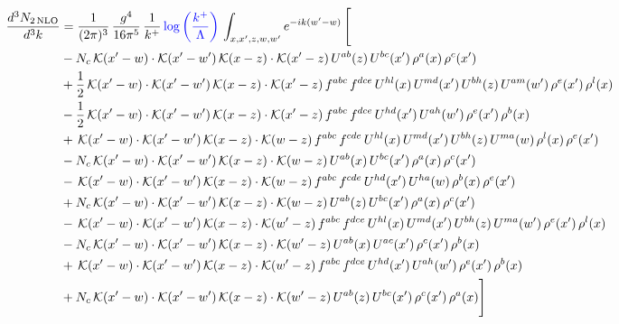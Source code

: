 \documentclass[9pt]{article}
\numberwithin{equation}{section}
\begin{document}
\begin{align}
\frac{d^{3}N_{2\,\mathrm{NLO}}}{d^{3}k} & = \frac{1}{(2\pi)^{3}}\,\frac{g^{4}}{16\pi^{5}}\,\frac{1}{k^{+}}\,{\color{blue}\log{\left(\frac{k^{+}}{\Lambda}\right)}}\,\int_{x,x',z,w,w'}e^{-ik(w'-w)}\,\Bigg[\notag\\ & -N_{c}\,\mathcal{K}(x'-w)\cdot\mathcal{K}(x'-w')\,\mathcal{K}(x-z)\cdot\mathcal{K}(x'-z)\,U^{ab}(z)\,U^{bc}(x')\,\rho^{a}(x)\,\rho^{c}(x')\notag\\
& +\frac{1}{2}\,\mathcal{K}(x'-w)\cdot\mathcal{K}(x'-w')\,\mathcal{K}(x-z)\cdot\mathcal{K}(x'-z)\,f^{abc}\,f^{dce}\,U^{hl}(x)\,U^{md}(x')\,U^{bh}(z)\,U^{am}(w')\,\rho^{e}(x')\,\rho^{l}(x)\notag\\
& -\frac{1}{2}\,\mathcal{K}(x'-w)\cdot\mathcal{K}(x'-w')\,\mathcal{K}(x-z)\cdot\mathcal{K}(x'-z)\,f^{abc}\,f^{dce}\,U^{hd}(x')\,U^{ah}(w')\,\rho^{e}(x')\,\rho^{b}(x)\notag\\
& +\,\mathcal{K}(x'-w)\cdot\mathcal{K}(x'-w')\,\mathcal{K}(x-z)\cdot\mathcal{K}(w-z)\,f^{abc}\,f^{cde}\,U^{hl}(x)\,U^{md}(x')\,U^{bh}(z)\,U^{ma}(w)\,\rho^{l}(x)\,\rho^{e}(x')\notag\\
& -N_{c}\,\mathcal{K}(x'-w)\cdot\mathcal{K}(x'-w')\,\mathcal{K}(x-z)\cdot\mathcal{K}(w-z)\,U^{ab}(x)\,U^{bc}(x')\,\rho^{a}(x)\,\rho^{c}(x')\notag\\
& -\,\mathcal{K}(x'-w)\cdot\mathcal{K}(x'-w')\,\mathcal{K}(x-z)\cdot\mathcal{K}(w-z)\,f^{abc}\,f^{cde}\,U^{hd}(x')\,U^{ha}(w)\,\rho^{b}(x)\,\rho^{e}(x')\notag\\
& +N_{c}\,\mathcal{K}(x'-w)\cdot\mathcal{K}(x'-w')\,\mathcal{K}(x-z)\cdot\mathcal{K}(w-z)\,U^{ab}(z)\,U^{bc}(x')\,\rho^{a}(x)\,\rho^{c}(x')\notag\\
& -\,\mathcal{K}(x'-w)\cdot\mathcal{K}(x'-w')\,\mathcal{K}(x-z)\cdot\mathcal{K}(w'-z)\,f^{abc}\,f^{dce}\,U^{hl}(x)\,U^{md}(x')\,U^{bh}(z)\,U^{ma}(w')\,\rho^{e}(x')\,\rho^{l}(x)\notag\\
& -N_{c}\,\mathcal{K}(x'-w)\cdot\mathcal{K}(x'-w')\,\mathcal{K}(x-z)\cdot\mathcal{K}(w'-z)\,U^{ab}(x)\,U^{ac}(x')\,\rho^{c}(x')\,\rho^{b}(x)\notag\\
& +\,\mathcal{K}(x'-w)\cdot\mathcal{K}(x'-w')\,\mathcal{K}(x-z)\cdot\mathcal{K}(w'-z)\,f^{abc}\,f^{dce}\,U^{hd}(x')\,U^{ah}(w')\,\rho^{e}(x')\,\rho^{b}(x)\notag\\
& +N_{c}\,\mathcal{K}(x'-w)\cdot\mathcal{K}(x'-w')\,\mathcal{K}(x-z)\cdot\mathcal{K}(w'-z)\,U^{ab}(z)\,U^{bc}(x')\,\rho^{c}(x')\,\rho^{a}(x)\Bigg]
\end{align}
\end{document}
